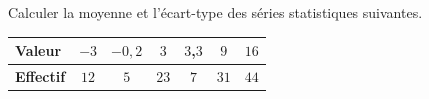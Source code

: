 \begin{exo}
	Calculer la moyenne et l'écart-type des séries statistiques suivantes.

	\begin{center}
		\def\arraystretch{1.4}
		\begin{tabular}{|l|*{6}{c|}} \hline
			\textbf{Valeur}   & $-3$ & $-0,2$ & $3$  & $3$,$3$ & $9$  & $16$ \\ \hline
			\textbf{Effectif} & $12$ & $5$    & $23$ & $7$     & $31$ & $44$ \\ \hline
		\end{tabular}
	\end{center}
\end{exo}
